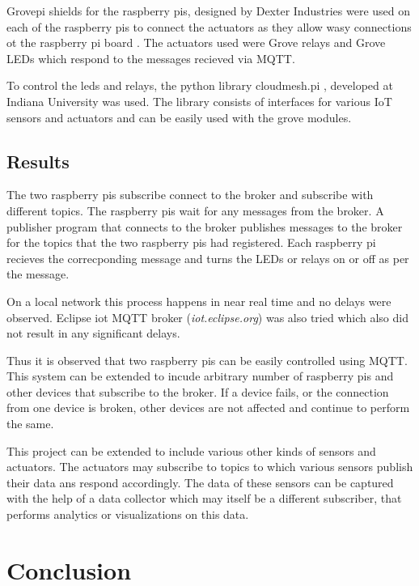 \documentclass[sigconf]{acmart}
\begin{document}
Grovepi shields for the raspberry pis, designed by Dexter Industries
were used on each of the raspberry pis to connect the actuators as
they allow wasy connections ot the raspberry pi board \cite{grovepi}.
The actuators used were Grove relays \cite{grove-relay} and Grove LEDs
\cite{grove-led} which respond to the messages recieved via MQTT.

To control the leds and relays, the python library cloudmesh.pi
\cite{cloudmesh.pi}, developed at Indiana University was used. The
library consists of interfaces for various IoT sensors and actuators
and can be easily used with the grove modules.



\subsection{Results}

The two raspberry pis subscribe connect to the broker and subscribe
with different topics. The raspberry pis wait for any messages from
the broker. A publisher program that connects to the broker publishes
messages to the broker for the topics that the two raspberry pis had
registered. Each raspberry pi recieves the correcponding message and
turns the LEDs or relays on or off as per the message.

On a local network this process happens in near real time and no
delays were observed. Eclipse iot MQTT broker ({\em iot.eclipse.org})
was also tried which also did not result in any significant delays.

Thus it is observed that two raspberry pis can be easily controlled
using MQTT. This system can be extended to incude arbitrary number of
raspberry pis and other devices that subscribe to the broker. If a
device fails, or the connection from one device is broken, other
devices are not affected and continue to perform the same.

This project can be extended to include various other kinds of sensors
and actuators. The actuators may subscribe to topics to which various
sensors publish their data ans respond accordingly. The data of these
sensors can be captured with the help of a data collector which may
itself be a different subscriber, that performs analytics or
visualizations on this data.


\section{Conclusion}
\end{document}
